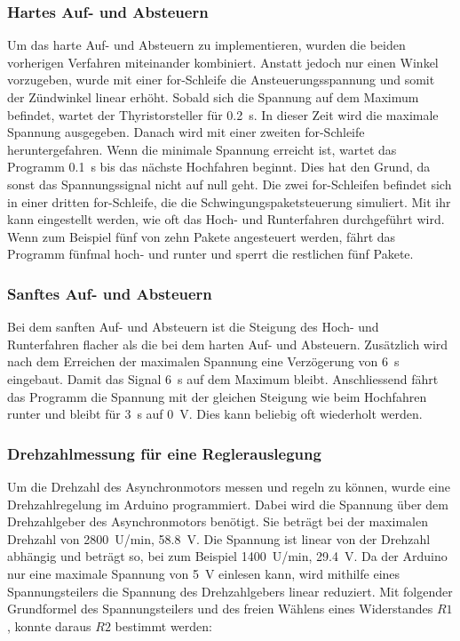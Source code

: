 \subsubsection{Hartes Auf- und Absteuern}
Um das harte Auf- und Absteuern zu implementieren, wurden die beiden vorherigen Verfahren miteinander kombiniert. Anstatt jedoch nur einen Winkel vorzugeben, wurde mit einer for-Schleife die Ansteuerungsspannung und somit der Zündwinkel linear erhöht. Sobald sich die Spannung auf dem Maximum befindet, wartet der Thyristorsteller für \SI{0.2}{s}. In dieser Zeit wird die maximale Spannung ausgegeben. Danach wird mit einer zweiten for-Schleife heruntergefahren. Wenn die minimale Spannung erreicht ist, wartet das Programm \SI{0.1}{s} bis das nächste Hochfahren beginnt. Dies hat den Grund, da sonst das Spannungssignal nicht auf null geht. Die zwei for-Schleifen befindet sich in einer dritten for-Schleife, die die Schwingungspaketsteuerung simuliert. Mit ihr kann eingestellt werden, wie oft das Hoch- und Runterfahren durchgeführt wird. Wenn zum Beispiel fünf von zehn Pakete angesteuert werden, fährt das Programm fünfmal hoch- und runter und sperrt die restlichen fünf Pakete. 

\subsubsection{Sanftes Auf- und Absteuern}
Bei dem sanften Auf- und Absteuern ist die Steigung des Hoch- und Runterfahren flacher als die bei dem harten Auf- und Absteuern. Zusätzlich wird nach dem Erreichen der maximalen Spannung eine Verzögerung von \SI{6}{s} eingebaut. Damit das Signal \SI{6}{s} auf dem Maximum bleibt. Anschliessend fährt das Programm die Spannung mit der gleichen Steigung wie beim Hochfahren runter und bleibt für \SI{3}{s} auf \SI{0}{V}. Dies kann beliebig oft wiederholt werden.


\subsubsection{Drehzahlmessung für eine Reglerauslegung}
Um die Drehzahl des Asynchronmotors messen und regeln zu können, wurde eine Drehzahlregelung im Arduino programmiert. Dabei wird die Spannung über dem Drehzahlgeber des Asynchronmotors benötigt. Sie beträgt bei der maximalen Drehzahl von \SI{2800}{U/min}, \SI{58.8}{V}. Die Spannung ist linear von der Drehzahl abhängig und beträgt so, bei zum Beispiel \SI{1400}{U/min}, \SI{29.4}{V}. Da der Arduino nur eine maximale Spannung von \SI{5}{V} einlesen kann, wird mithilfe eines Spannungsteilers die Spannung des Drehzahlgebers linear reduziert. Mit folgender Grundformel des Spannungsteilers und des freien Wählens eines Widerstandes $R1$, konnte daraus $R2$ bestimmt werden:

